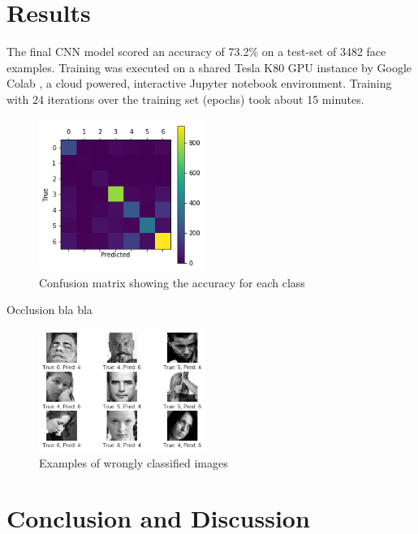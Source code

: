 \documentclass[twoside]{article}
\begin{document}
\begin{multicols}{2}


\section{Results}
The final CNN model scored an accuracy of 73.2\% on a test-set of 3482 face examples. Training was executed on a shared Tesla K80 GPU instance by Google Colab \cite{colab}, a cloud powered, interactive Jupyter notebook environment. Training with 24 iterations over the training set (epochs) took about 15 minutes.

\begin{figure}[H]
	\includegraphics[width=0.48\textwidth]{confusion}
	\caption{Confusion matrix showing the accuracy for each class}
\end{figure}

Occlusion bla bla

\begin{figure}[H]
	\includegraphics[width=0.48\textwidth]{errors}
	\caption{Examples of wrongly classified images}
\end{figure}



\section{Conclusion and Discussion}


\end{multicols}
\end{document}
